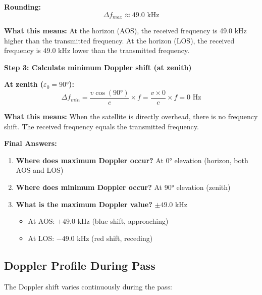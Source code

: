 \documentclass[11pt,letterpaper]{article}
\begin{document}
\textbf{Rounding:}
\begin{equation}
\Delta f_{max} \approx 49.0 \text{ kHz}
\end{equation}

\textbf{What this means:} At the horizon (AOS), the received frequency is 49.0 kHz higher than the transmitted frequency. At the horizon (LOS), the received frequency is 49.0 kHz lower than the transmitted frequency.

\vspace{0.3cm}

\textbf{Step 3: Calculate minimum Doppler shift (at zenith)}

\textbf{At zenith ($\varepsilon_0 = 90°$):}
\begin{equation}
\Delta f_{min} = \frac{v \cos(90°)}{c} \times f = \frac{v \times 0}{c} \times f = 0 \text{ Hz}
\end{equation}

\textbf{What this means:} When the satellite is directly overhead, there is no frequency shift. The received frequency equals the transmitted frequency.

\vspace{0.3cm}

\textbf{Final Answers:}
\begin{enumerate}
    \item \textbf{Where does maximum Doppler occur?} At 0° elevation (horizon, both AOS and LOS)
    \item \textbf{Where does minimum Doppler occur?} At 90° elevation (zenith)
    \item \textbf{What is the maximum Doppler value?} $\pm 49.0$ kHz
    \begin{itemize}
        \item At AOS: $+49.0$ kHz (blue shift, approaching)
        \item At LOS: $-49.0$ kHz (red shift, receding)
    \end{itemize}
\end{enumerate}

\subsection{Doppler Profile During Pass}

The Doppler shift varies continuously during the pass:
\end{document}

